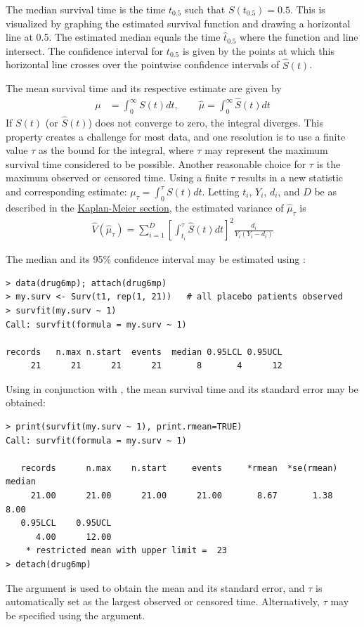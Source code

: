 \documentclass[11pt]{article}
\begin{document}
\pagebreak

{}
\label{meanAndMedianEstimates}

The median survival time is the time $t_{0.5}$ such that $S(t_{0.5}) = 0.5$. This is visualized by graphing the estimated survival function and drawing a horizontal line at 0.5. The estimated median equals the time $\hat{t}_{0.5}$ where the function and line intersect. The confidence interval for $t_{0.5}$ is given by the points at which this horizontal line crosses over the pointwise confidence intervals of $\hat{S}(t)$.

\noindent The mean survival time and its respective estimate are given by
\begin{align*}
\mu &= \int_0^\infty S(t)dt, \qquad\hat{\mu} = \int_0^\infty \hat{S}(t)dt
\end{align*}
If $S(t)$ (or $\hat{S}(t)$) does not converge to zero, the integral diverges. This property creates a challenge for most data, and one resolution is to use a finite value $\tau$ as the bound for the integral, where $\tau$ may represent the maximum survival time considered to be possible. Another reasonable choice for $\tau$ is the maximum observed or censored time. Using a finite $\tau$ results in a new statistic and corresponding estimate: $\mu_\tau = \int_0^\tau S(t)dt$. Letting $t_i$, $Y_i$, $d_i$, and $D$ be as described in the \hyperref[kapMeiEstimateAndBounds]{Kaplan-Meier section}, the estimated variance of $\hat{\mu}_\tau$ is
\begin{eqnarray*}
\widehat{V}(\hat{\mu}_\tau) = \sum_{i=1}^D\left[\int_{t_i}^\tau \hat{S}(t)dt\right]^2 \frac{d_i}{Y_i(Y_i-d_i)}
\end{eqnarray*}

The median and its 95\% confidence interval may be estimated using :
{\color{verbatimrcom}\begin{verbatim}
> data(drug6mp); attach(drug6mp)
> my.surv <- Surv(t1, rep(1, 21))   # all placebo patients observed
> survfit(my.surv ~ 1)
Call: survfit(formula = my.surv ~ 1)

records   n.max n.start  events  median 0.95LCL 0.95UCL 
     21      21      21      21       8       4      12 
\end{verbatim}}
Using  in conjunction with , the mean survival time and its standard error may be obtained:
{\color{verbatimrcom}\begin{verbatim}
> print(survfit(my.surv ~ 1), print.rmean=TRUE)
Call: survfit(formula = my.surv ~ 1)

   records      n.max    n.start     events     *rmean  *se(rmean)    median 
     21.00      21.00      21.00      21.00       8.67       1.38       8.00 
   0.95LCL    0.95UCL 
      4.00      12.00 
    * restricted mean with upper limit =  23 
> detach(drug6mp)
\end{verbatim}}
The  argument is used to obtain the mean and its standard error, and $\tau$ is automatically set as the largest observed or censored time. Alternatively, $\tau$ may be specified using the  argument.
\end{document}
